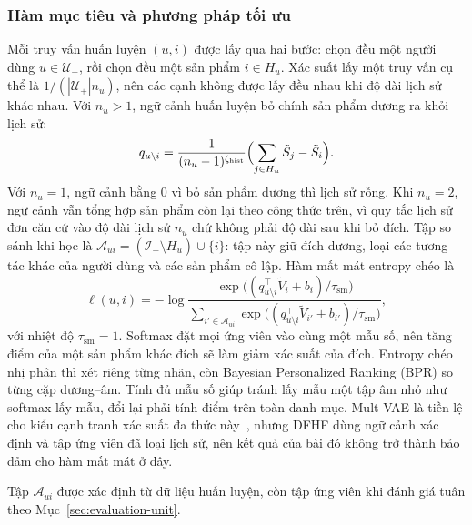 \subsubsection{Hàm mục tiêu và phương pháp tối ưu}
\label{sec:dfhf-objective}

Mỗi truy vấn huấn luyện $(u,i)$ được lấy qua hai bước: chọn đều một người dùng $u\in\mathcal{U}_+$, rồi chọn đều một sản phẩm $i\in H_u$. Xác suất lấy một truy vấn cụ thể là $1/(|\mathcal{U}_+|n_u)$, nên các cạnh không được lấy đều nhau khi độ dài lịch sử khác nhau. Với $n_u>1$, ngữ cảnh huấn luyện bỏ chính sản phẩm dương ra khỏi lịch sử:
\begin{equation}
q_{u\setminus i} = \frac{1}{(n_u-1)^{\zeta_{\mathrm{hist}}}}\Bigl(\sum_{j\in H_u}\tilde S_j - \tilde S_i\Bigr).
\end{equation}
Với $n_u=1$, ngữ cảnh bằng 0 vì bỏ sản phẩm dương thì lịch sử rỗng. Khi $n_u=2$, ngữ cảnh vẫn tổng hợp sản phẩm còn lại theo công thức trên, vì quy tắc lịch sử đơn căn cứ vào độ dài lịch sử $n_u$ chứ không phải độ dài sau khi bỏ đích. Tập so sánh khi học là $\mathcal{A}_{ui}=(\mathcal{I}_+\setminus H_u)\cup\{i\}$: tập này giữ đích dương, loại các tương tác khác của người dùng và các sản phẩm cô lập. Hàm mất mát entropy chéo là
\begin{equation}
\ell(u,i) = -\log\frac{\exp\bigl((q_{u\setminus i}^\top\tilde V_i + b_i)/\tau_{\mathrm{sm}}\bigr)}{\sum_{i'\in\mathcal{A}_{ui}}\exp\bigl((q_{u\setminus i}^\top\tilde V_{i'} + b_{i'})/\tau_{\mathrm{sm}}\bigr)},
\label{eq:dfhf-loss}
\end{equation}
với nhiệt độ $\tau_{\mathrm{sm}}=1$. Softmax đặt mọi ứng viên vào cùng một mẫu số, nên tăng điểm của một sản phẩm khác đích sẽ làm giảm xác suất của đích. Entropy chéo nhị phân thì xét riêng từng nhãn, còn Bayesian Personalized Ranking (BPR) so từng cặp dương--âm. Tính đủ mẫu số giúp tránh lấy mẫu một tập âm nhỏ như softmax lấy mẫu, đổi lại phải tính điểm trên toàn danh mục. Mult-VAE là tiền lệ cho kiểu cạnh tranh xác suất đa thức này~\cite{liang2018multvae}, nhưng DFHF dùng ngữ cảnh xác định và tập ứng viên đã loại lịch sử, nên kết quả của bài đó không trở thành bảo đảm cho hàm mất mát ở đây.

Tập $\mathcal{A}_{ui}$ được xác định từ dữ liệu huấn luyện, còn tập ứng viên khi đánh giá tuân theo Mục~\ref{sec:evaluation-unit}.

